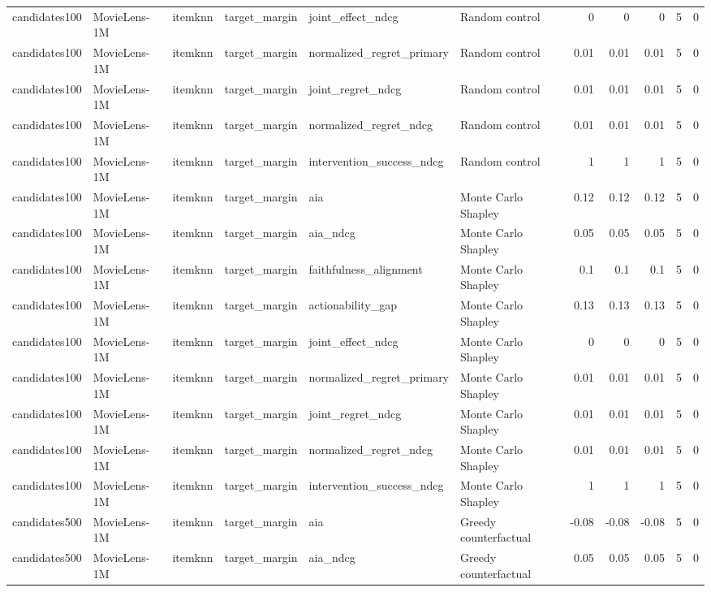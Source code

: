 \begin{table}[t]
{\begin{tabular}{llllllrrrrr}
candidates100 & MovieLens-1M & itemknn & target\_margin & joint\_effect\_ndcg & Random control & 0 & 0 & 0 & 5 & 0 \\
candidates100 & MovieLens-1M & itemknn & target\_margin & normalized\_regret\_primary & Random control & 0.01 & 0.01 & 0.01 & 5 & 0 \\
candidates100 & MovieLens-1M & itemknn & target\_margin & joint\_regret\_ndcg & Random control & 0.01 & 0.01 & 0.01 & 5 & 0 \\
candidates100 & MovieLens-1M & itemknn & target\_margin & normalized\_regret\_ndcg & Random control & 0.01 & 0.01 & 0.01 & 5 & 0 \\
candidates100 & MovieLens-1M & itemknn & target\_margin & intervention\_success\_ndcg & Random control & 1 & 1 & 1 & 5 & 0 \\
candidates100 & MovieLens-1M & itemknn & target\_margin & aia & Monte Carlo Shapley & 0.12 & 0.12 & 0.12 & 5 & 0 \\
candidates100 & MovieLens-1M & itemknn & target\_margin & aia\_ndcg & Monte Carlo Shapley & 0.05 & 0.05 & 0.05 & 5 & 0 \\
candidates100 & MovieLens-1M & itemknn & target\_margin & faithfulness\_alignment & Monte Carlo Shapley & 0.1 & 0.1 & 0.1 & 5 & 0 \\
candidates100 & MovieLens-1M & itemknn & target\_margin & actionability\_gap & Monte Carlo Shapley & 0.13 & 0.13 & 0.13 & 5 & 0 \\
candidates100 & MovieLens-1M & itemknn & target\_margin & joint\_effect\_ndcg & Monte Carlo Shapley & 0 & 0 & 0 & 5 & 0 \\
candidates100 & MovieLens-1M & itemknn & target\_margin & normalized\_regret\_primary & Monte Carlo Shapley & 0.01 & 0.01 & 0.01 & 5 & 0 \\
candidates100 & MovieLens-1M & itemknn & target\_margin & joint\_regret\_ndcg & Monte Carlo Shapley & 0.01 & 0.01 & 0.01 & 5 & 0 \\
candidates100 & MovieLens-1M & itemknn & target\_margin & normalized\_regret\_ndcg & Monte Carlo Shapley & 0.01 & 0.01 & 0.01 & 5 & 0 \\
candidates100 & MovieLens-1M & itemknn & target\_margin & intervention\_success\_ndcg & Monte Carlo Shapley & 1 & 1 & 1 & 5 & 0 \\
candidates500 & MovieLens-1M & itemknn & target\_margin & aia & Greedy counterfactual & -0.08 & -0.08 & -0.08 & 5 & 0 \\
candidates500 & MovieLens-1M & itemknn & target\_margin & aia\_ndcg & Greedy counterfactual & 0.05 & 0.05 & 0.05 & 5 & 0 \\

\end{tabular}}
\end{table}
